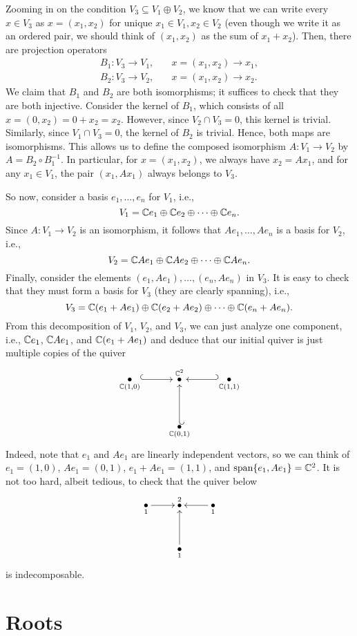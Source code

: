 \documentclass[oneside]{scrbook}
\begin{document}
Zooming in on the condition $V_3\subseteq V_1\oplus V_2$, we know that we can write every $x\in V_3$ as $x=(x_1,x_2)$ for unique $x_1\in V_1, x_2\in V_2$ (even though we write it as an ordered pair, we should think of $(x_1,x_2)$ as the sum of $x_1+x_2$). Then, there are projection operators
\begin{align*}
    B_1\colon V_3\to V_1,&\quad x=(x_1,x_2)\to x_1,\\
    B_2\colon V_3\to V_2,&\quad x=(x_1,x_2)\to x_2.
\end{align*}
We claim that $B_1$ and $B_2$ are both isomorphisms; it suffices to check that they are both injective. Consider the kernel of $B_1$, which consists of all $x=(0,x_2)=0+x_2=x_2$. However, since $V_2\cap V_3=0$, this kernel is trivial. Similarly, since $V_1\cap V_3=0$, the kernel of $B_2$ is trivial. Hence, both maps are isomorphisms. This allows us to define the composed isomorphism $A\colon V_1\to V_2$ by $A=B_2\circ B_1^{-1}$. In particular, for $x=(x_1,x_2)$, we always have $x_2=Ax_1$, and for any $x_1\in V_1$, the pair $(x_1,Ax_1)$ always belongs to $V_3$. 

So now, consider a basis $e_1,\ldots, e_n$ for $V_1$, i.e.,
\[V_1=\mathbb C e_1\oplus \mathbb C e_2\oplus\cdots\oplus \mathbb C e_n.\]
Since $A\colon V_1\to V_2$ is an isomorphism, it follows that $Ae_1,\ldots,Ae_n$ is a basis for $V_2$, i.e.,
\[V_2=\mathbb C Ae_1\oplus \mathbb C Ae_2\oplus\cdots\oplus \mathbb C Ae_n.\]
Finally, consider the elements $(e_1,Ae_1),\ldots,(e_n,Ae_n)$ in $V_3$. It is easy to check that they must form a basis for $V_3$ (they are clearly spanning), i.e.,
\[V_3=\mathbb C (e_1+Ae_1)\oplus \mathbb C (e_2+Ae_2)\oplus \cdots\oplus \mathbb C (e_n+Ae_n).\]
From this decomposition of $V_1$, $V_2$, and $V_3$, we can just analyze one component, i.e., $\mathbb C e_1$, $\mathbb C Ae_1$, and $\mathbb C (e_1+Ae_1)$ and deduce that our initial quiver is just multiple copies of the quiver
\[\xymatrix{
\underset{\CC (1,0)}{\bullet} \ar@{^{(}->}[r] & \overset{\CC^2}{\bullet} & \ar@{_{(}->}[l] \underset{\CC(1,1)}{\bullet}\\
& \ar@{_{(}->}[u] \underset{\CC (0,1)}{\bullet} &
}\]
Indeed, note that $e_1$ and $Ae_1$ are linearly independent vectors, so we can think of $e_1=(1,0)$, $Ae_1=(0,1)$, $e_1+Ae_1=(1,1)$, and $\text{span}\{e_1,Ae_1\}=\mathbb C^2$. It is not too hard, albeit tedious, to check that the quiver below
\[\xymatrix{
\underset{1}{\bullet} \ar[r] & \overset{2}{\bullet} & \ar[l] \underset{1}{\bullet}\\
& \underset{1}{\bullet} \ar[u] &
}\]
is indecomposable.


\section{Roots}
\end{document}
